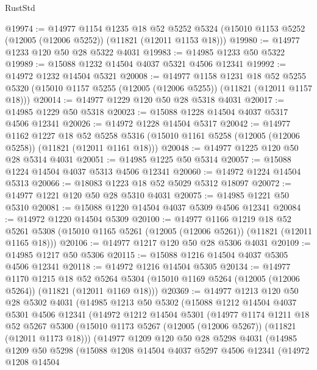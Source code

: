 \begin{lexlean}{RustStd}
\begin{coremodule}
@19974 := @14977
    @1154
    @1235
    @18
    @52
    @5252
    @5324
    (@15010 @1153 @5252 (@12005 (@12006 @5252)) (@11821 (@12011 @1153 @18)))
@19980 := @14977 @1233 @120 @50 @28 @5322 @4031
@19983 := @14985 @1233 @50 @5322
@19989 := @15088 @1232 @14504 @4037 @5321 @4506 @12341
@19992 := @14972 @1232 @14504 @5321
@20008 := @14977
    @1158
    @1231
    @18
    @52
    @5255
    @5320
    (@15010 @1157 @5255 (@12005 (@12006 @5255)) (@11821 (@12011 @1157 @18)))
@20014 := @14977 @1229 @120 @50 @28 @5318 @4031
@20017 := @14985 @1229 @50 @5318
@20023 := @15088 @1228 @14504 @4037 @5317 @4506 @12341
@20026 := @14972 @1228 @14504 @5317
@20042 := @14977
    @1162
    @1227
    @18
    @52
    @5258
    @5316
    (@15010 @1161 @5258 (@12005 (@12006 @5258)) (@11821 (@12011 @1161 @18)))
@20048 := @14977 @1225 @120 @50 @28 @5314 @4031
@20051 := @14985 @1225 @50 @5314
@20057 := @15088 @1224 @14504 @4037 @5313 @4506 @12341
@20060 := @14972 @1224 @14504 @5313
@20066 := @18083 @1223 @18 @52 @5029 @5312 @18097
@20072 := @14977 @1221 @120 @50 @28 @5310 @4031
@20075 := @14985 @1221 @50 @5310
@20081 := @15088 @1220 @14504 @4037 @5309 @4506 @12341
@20084 := @14972 @1220 @14504 @5309
@20100 := @14977
    @1166
    @1219
    @18
    @52
    @5261
    @5308
    (@15010 @1165 @5261 (@12005 (@12006 @5261)) (@11821 (@12011 @1165 @18)))
@20106 := @14977 @1217 @120 @50 @28 @5306 @4031
@20109 := @14985 @1217 @50 @5306
@20115 := @15088 @1216 @14504 @4037 @5305 @4506 @12341
@20118 := @14972 @1216 @14504 @5305
@20134 := @14977
    @1170
    @1215
    @18
    @52
    @5264
    @5304
    (@15010 @1169 @5264 (@12005 (@12006 @5264)) (@11821 (@12011 @1169 @18)))
@20369 := @14977
    @1213
    @120
    @50
    @28
    @5302
    @4031
    (@14985
      @1213
      @50
      @5302
      (@15088
        @1212
        @14504
        @4037
        @5301
        @4506
        @12341
        (@14972
          @1212
          @14504
          @5301
          (@14977
            @1174
            @1211
            @18
            @52
            @5267
            @5300
            (@15010 @1173 @5267 (@12005 (@12006 @5267)) (@11821 (@12011 @1173 @18)))
            (@14977
              @1209
              @120
              @50
              @28
              @5298
              @4031
              (@14985
                @1209
                @50
                @5298
                (@15088
                  @1208
                  @14504
                  @4037
                  @5297
                  @4506
                  @12341
                  (@14972
                    @1208
                    @14504

\end{coremodule}
\end{lexlean}

